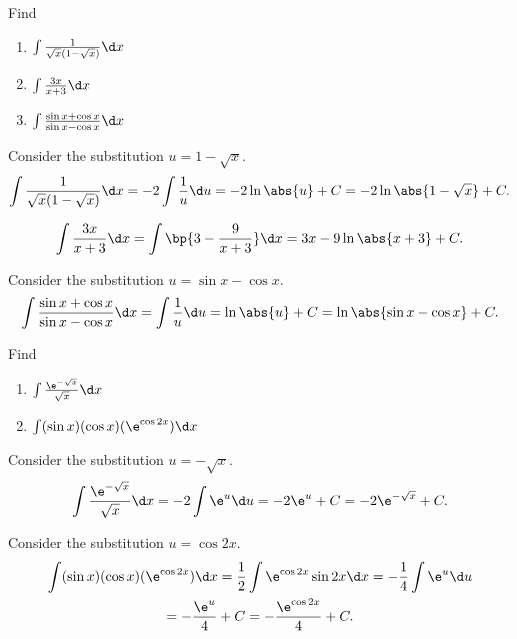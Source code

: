 \begin{problem}
    Find
    \begin{enumerate}
        \item $\int \frac1{\sqrt{x}(1- \sqrt{x})} \d x$
        \item $\int \frac{3x}{x+3} \d x$
        \item $\int \frac{\sin x + \cos x}{\sin x - \cos x} \d x$
    \end{enumerate}
\end{problem}
\begin{solution}
    \begin{ppart}
        Consider the substitution $u = 1 - \sqrt x$. \[\int \frac1{\sqrt{x}(1- \sqrt{x})} \d x = -2 \int \frac1{u} \d u = -2 \ln \abs{u} + C = -2 \ln \abs{1 - \sqrt{x}} + C.\]
    \end{ppart}
    \begin{ppart}
        \[\int \frac{3x}{x+3} \d x = \int \bp{3 - \frac9{x+3} }\d x = 3x - 9\ln\abs{x+3} + C.\]
    \end{ppart}
    \begin{ppart}
        Consider the substitution $u = \sin x - \cos x$. \[\int \frac{\sin x + \cos x}{\sin x - \cos x}\d x = \int \frac1{u} \d u = \ln \abs{u} + C = \ln \abs{\sin x - \cos x} + C.\]
    \end{ppart}
\end{solution}

\begin{problem}
    Find 
    \begin{enumerate}
        \item $\int \frac{\e^{-\sqrt{x}}}{\sqrt{x}} \d x$
        \item $\int (\sin x)(\cos x)(\e^{\cos 2x}) \d x$
    \end{enumerate}
\end{problem}
\clearpage
\begin{solution}
    \begin{ppart}
        Consider the substitution $u = -\sqrt x$. \[\int \frac{\e^{-\sqrt{x}}}{\sqrt{x}} \d x = -2\int \e^{u} \d u = -2\e^u + C = -2\e^{-\sqrt{x}} + C.\]
    \end{ppart}
    \begin{ppart}
        Consider the substitution $u = \cos 2x$.
        \begin{gather*}
            \int (\sin x)(\cos x)(\e^{\cos 2x}) \d x = \frac12 \int \e^{\cos 2x} \sin 2x \d x = -\frac14 \int \e^u \d u \\
            = -\frac{\e^u }4 + C = -\frac{\e^{\cos 2x}}4 + C.
        \end{gather*}
    \end{ppart}
\end{solution}

